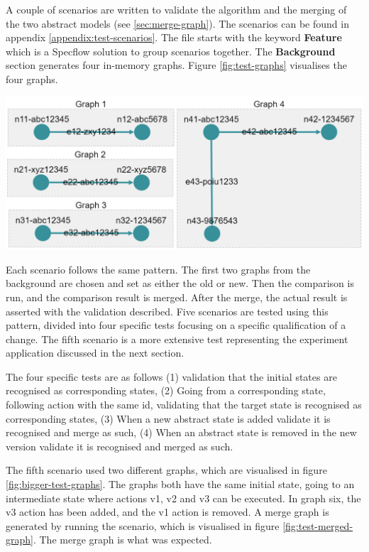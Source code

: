A couple of scenarios are written to validate the algorithm and the merging of the two abstract models (see \ref{sec:merge-graph}). The scenarios can be found in appendix \ref{appendix:test-scenarios}. The file starts with the keyword \textbf{Feature} which is a Specflow solution to group scenarios together. The \textbf{Background} section generates four in-memory graphs. Figure \ref{fig:test-graphs} visualises the four graphs. 

\begingroup
\captionsetup{type=figure}
\includegraphics[scale=0.6]{images/6-TestGraphs.png}
\label{fig:test-graphs}
\endgroup

Each scenario follows the same pattern. The first two graphs from the background are chosen and set as either the old or new. Then the comparison is run, and the comparison result is merged. After the merge, the actual result is asserted with the validation described. Five scenarios are tested using this pattern, divided into four specific tests focusing on a specific qualification of a change. The fifth scenario is a more extensive test representing the experiment application discussed in the next section.

The four specific tests are as follows (1) validation that the initial states are recognised as corresponding states, (2) Going from a corresponding state, following action with the same id, validating that the target state is recognised as corresponding states, (3) When a new abstract state is added validate it is recognised and merge as such, (4) When an abstract state is removed in the new version validate it is recognised and merged as such.

The fifth scenario used two different graphs, which are visualised in figure \ref{fig:bigger-test-graphs}. The graphs both have the same initial state, going to an intermediate state where actions v1, v2 and v3 can be executed. In graph six, the v3 action has been added, and the v1 action is removed. A merge graph is generated by running the scenario, which is visualised in figure \ref{fig:test-merged-graph}. The merge graph is what was expected. 

